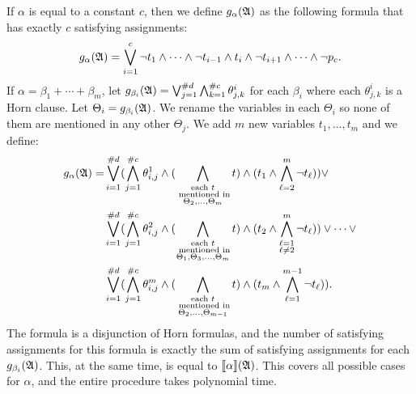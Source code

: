 If $\alpha$ is equal to a constant $c$, then we define $g_{\alpha}(\mathfrak{A})$ as the following formula that has exactly $c$ satisfying assignments:
$$
g_{\alpha}(\mathfrak{A}) = \bigvee_{i = 1}^{c}\neg t_1 \wedge \cdots \wedge \neg t_{i-1} \wedge t_i \wedge \neg t_{i+1} \wedge \cdots \wedge \neg p_c.
$$ 
If $\alpha = \beta_1 + \cdots + \beta_m$, let $g_{\beta_i}(\mathfrak{A}) = \bigvee_{j = 1}^{\#d}\bigwedge_{k = 1}^{\#c}\theta^i_{j,k}$ for each $\beta_i$ where each $\theta^i_{j,k}$ is a Horn clause. Let $\Theta_i = g_{\beta_i}(\mathfrak{A})$. We rename the variables in each $\Theta_i$ so none of them are mentioned in any other $\Theta_j$. We add $m$ new variables $t_1,\ldots,t_m$ and we define:
\begin{align*}
g_{\alpha}(\mathfrak{A}) = &\bigvee_{i = 1}^{\#d}(\bigwedge_{j = 1}^{\#c}\theta^1_{i,j} \wedge (\bigwedge\limits_{\substack{\text{each } t\\ \text{ mentioned in}\\ \Theta_2,\ldots,\Theta_{m}}}t) \wedge (t_1 \wedge \bigwedge_{\ell = 2}^{m} \neg t_{\ell})) \vee \\ 
&\bigvee_{i = 1}^{\#d}(\bigwedge_{j = 1}^{\#c}\theta^2_{i,j} \wedge (\bigwedge\limits_{\substack{\text{each $t$}\\ \text{ mentioned in}\\ \Theta_1,\Theta_3,\ldots,\Theta_{m}}}t) \wedge (t_2 \wedge \bigwedge\limits_{\substack{\ell = 1 \\ \ell \neq 2}}^{m} \neg t_{\ell})) \vee \cdots \vee\\ 
&\bigvee_{i = 1}^{\#d}(\bigwedge_{j = 1}^{\#c}\theta^m_{i,j} \wedge (\bigwedge\limits_{\substack{\text{each } t\\ \text{ mentioned in}\\ \Theta_2,\ldots,\Theta_{m-1}}}t) \wedge (t_m \wedge \bigwedge_{\ell = 1}^{m-1} \neg t_{\ell})).
\end{align*}
The formula is a disjunction of Horn formulas, and the number of satisfying assignments for this formula is exactly the sum of satisfying assignments for each $g_{\beta_i}(\mathfrak{A})$. This, at the same time, is equal to ${\llbracket{}{\alpha}\rrbracket}(\mathfrak{A})$. This covers all possible cases for $\alpha$, and the entire procedure takes polynomial time.